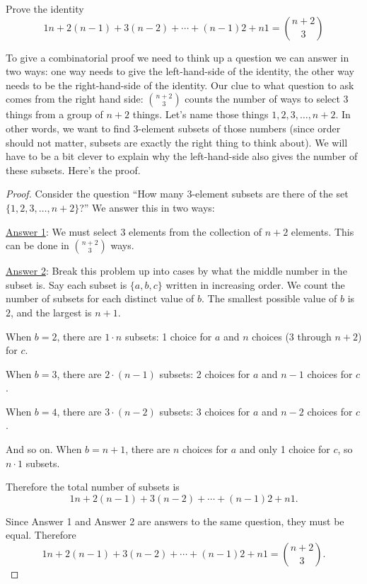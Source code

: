 \documentclass[12pt]{article}
\begin{document}
\begin{example}
  Prove the identity
  \[1 n + 2(n-1) + 3  (n-2) + \cdots + (n-1) 2 + n  1 = {n+2 \choose 3}\]
  \begin{solution}
    To give a combinatorial proof we need to think up a question we can answer in two ways: one way needs to give the left-hand-side of the identity, the other way needs to be the right-hand-side of the identity.  Our clue to what question to ask comes from the right hand side: ${n+2 \choose 3}$ counts the number of ways to select 3 things from a group of $n+2$ things.  Let's name those things $1, 2, 3, \ldots, n+2$.  In other words, we want to find 3-element subsets of those numbers (since order should not matter, subsets are exactly the right thing to think about).  We will have to be a bit clever to explain why the left-hand-side also gives the number of these subsets.  Here's the proof.
    
    \begin{proof}
      Consider the question ``How many 3-element subsets are there of the set $\{1,2,3,\ldots, n+2\}$?''  We answer this in two ways:
      
      \underline{Answer 1}: We must select 3 elements from the collection of $n+2$ elements.  This can be done in ${n+2 \choose 3}$ ways.
      
      \underline{Answer 2}: Break this problem up into cases by what the middle number in the subset is.  Say each subset is $\{a,b,c\}$ written in increasing order.  We count the number of subsets for each distinct value of $b$.  The smallest possible value of $b$ is $2$, and the largest is $n+1$.  
      
      When $b = 2$, there are $1 \cdot n$ subsets: 1 choice for $a$ and $n$ choices (3 through $n+2$) for $c$.
      
      When $b = 3$, there are $2 \cdot (n-1)$ subsets: 2 choices for $a$ and $n-1$ choices for $c$.
      
      When $b = 4$, there are $3 \cdot (n-2)$ subsets: 3 choices for $a$ and $n-2$ choices for $c$.
      
      And so on.  When $b = n+1$, there are $n$ choices for $a$ and only 1 choice for $c$, so $n \cdot 1$ subsets.
      
      Therefore the total number of subsets is \[1 n + 2 (n-1) + 3  (n-2) + \cdots + (n-1)2 + n  1.\]
      
      Since Answer 1 and Answer 2 are answers to the same question, they must be equal.  Therefore
      \[1 n + 2 (n-1) + 3  (n-2) + \cdots + (n-1) 2 + n  1 = {n+2 \choose 3}.\]
      
    \end{proof}

  \end{solution}

\end{example}
\end{document}
